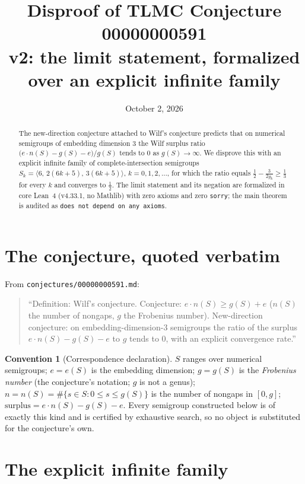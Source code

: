 \documentclass[11pt]{article}
\title{Disproof of TLMC Conjecture 00000000591\\
\large v2: the limit statement, formalized over an explicit infinite family}
\author{}
\date{October 2, 2026}
\theoremstyle{definition}
\newtheorem{convention}[theorem]{Convention}
\begin{document}
\maketitle

\begin{abstract}
The new-direction conjecture attached to Wilf's conjecture predicts that on
numerical semigroups of embedding dimension $3$ the Wilf surplus ratio
$\bigl(e\cdot n(S)-g(S)-e\bigr)/g(S)$ tends to $0$ as $g(S)\to\infty$. We
disprove this with an explicit infinite family of complete-intersection
semigroups $S_k=\langle 6,\,2(6k{+}5),\,3(6k{+}5)\rangle$, $k=0,1,2,\dots$, for
which the ratio equals $\tfrac12-\tfrac{3}{2g_k}\ge \tfrac13$ for every $k$ and
converges to $\tfrac12$. The limit statement and its negation are formalized in
core Lean~4 (v4.33.1, no Mathlib) with zero axioms and zero \texttt{sorry}; the
main theorem is audited as \texttt{does not depend on any axioms}.
\end{abstract}

\section{The conjecture, quoted verbatim}

From \texttt{conjectures/00000000591.md}:

\begin{quote}
``Definition: Wilf's conjecture. Conjecture: $e\cdot n(S) \ge g(S) + e$ ($n(S)$
the number of nongaps, $g$ the Frobenius number). New-direction conjecture: on
embedding-dimension-3 semigroups the ratio of the surplus $e\cdot n(S) - g(S) - e$
to $g$ tends to $0$, with an explicit convergence rate.''
\end{quote}

\begin{convention}[Correspondence declaration]
$S$ ranges over numerical semigroups; $e=e(S)$ is the embedding dimension;
$g=g(S)$ is the \emph{Frobenius number} (the conjecture's notation; $g$ is not
a genus); $n=n(S)=\#\{s\in S : 0\le s\le g(S)\}$ is the number of nongaps in
$[0,g]$; $\mathrm{surplus}=e\cdot n(S)-g(S)-e$. Every semigroup constructed
below is of exactly this kind and is certified by exhaustive search, so no
object is substituted for the conjecture's own.
\end{convention}

\section{The explicit infinite family}
\end{document}
